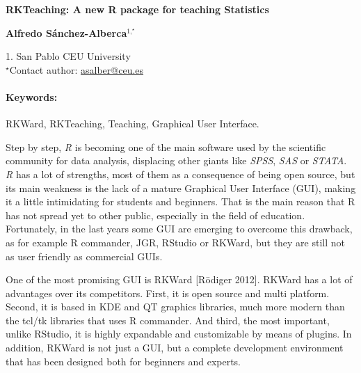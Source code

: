 \documentclass[11pt, a4paper]{article}
\newcommand{\pkg}[1]{{\normalfont\fontseries{b}\selectfont #1}}
\let\proglang=\textit
\renewcommand{\title}[1]{\begin{center}{\bf \LARGE #1}\end{center}}
\newcommand{\keywords}{\paragraph{Keywords:}}
\begin{document}
\pagestyle{empty}

\title{RKTeaching: A new R package for teaching Statistics}

\begin{center}
  {\bf Alfredo S\'anchez-Alberca$^{1,^\star}$}
\end{center}

\begin{affiliations}
1. San Pablo CEU University \\[-2pt]
$^\star$Contact author: \href{mailto:asalber@ceu.es}{asalber@ceu.es}
\end{affiliations}

\keywords RKWard, RKTeaching, Teaching, Graphical User Interface.

\vskip 0.8cm

Step by step, \proglang{R} is becoming one of the main software used by the scientific community for data analysis,
displacing other giants like \proglang{SPSS}, \proglang{SAS} or \proglang{STATA}.
\proglang{R} has a lot of strengths, most of them as a consequence of being open source, but its main weakness is the
lack of a mature Graphical User Interface (GUI), making it a little intimidating for students and beginners.
That is the main reason that R has not spread yet to other public, especially in the field of education.
Fortunately, in the last years some GUI are emerging to overcome this drawback, as for example \pkg{R commander}, \pkg{JGR}, \pkg{RStudio}
or \pkg{RKWard}, but they are still not as user friendly as commercial GUIs.

One of the most promising GUI is \pkg{RKWard} [R\"odiger 2012]. RKWard has a lot of advantages over its competitors. First,
it is open source and multi platform.
Second, it is based in KDE and QT graphics libraries, much more modern than the tcl/tk libraries that uses \pkg{R commander}.
And third, the most important, unlike \pkg{RStudio}, it is highly expandable and customizable by means of plugins. In
addition, \pkg{RKWard} is not just a GUI, but a complete development environment that has been designed both for beginners and
experts.
\end{document}
